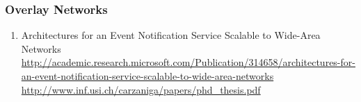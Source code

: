 \documentclass{article}
\begin{document}
\subsubsection{Overlay Networks}
\begin{enumerate}
	\item {Architectures for an Event Notification Service Scalable to Wide-Area Networks\\
\href{http://academic.research.microsoft.com/Publication/314658/architectures-for-an-event-notification-service-scalable-to-wide-area-networks}{http://academic.research.microsoft.com/Publication/314658/architectures-for-an-event-notification-service-scalable-to-wide-area-networks}\\
\url{http://www.inf.usi.ch/carzaniga/papers/phd_thesis.pdf}}
\end{enumerate}
\end{document}
